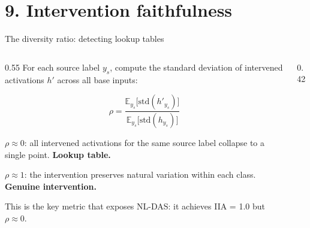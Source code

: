 \documentclass[aspectratio=169,11pt]{beamer}
\begin{document}
\hypertarget{sec9}{}
\section{9. Intervention faithfulness}

\begin{frame}{The diversity ratio: detecting lookup tables}

\begin{columns}[T]
\begin{column}{0.55\textwidth}
{\small For each source label $y_s$, compute the standard deviation of intervened activations $h'$ across all base inputs:}

$$\rho = \frac{\mathbb{E}_{y_s}\bigl[\text{std}(h'_{y_s})\bigr]}{\mathbb{E}_{y_s}\bigl[\text{std}(h_{y_s})\bigr]}$$

\vspace{0.3em}
{\small $\rho \approx 0$: all intervened activations for the same source label collapse to a single point. \textbf{Lookup table.}}

\vspace{0.3em}
{\small $\rho \approx 1$: the intervention preserves natural variation within each class. \textbf{Genuine intervention.}}

\vspace{0.3em}
{\small This is the key metric that exposes NL-DAS: it achieves IIA = 1.0 but $\rho \approx 0$.}
\end{column}
\begin{column}{0.42\textwidth}
\end{column}
\end{columns}
\end{frame}
\end{document}
